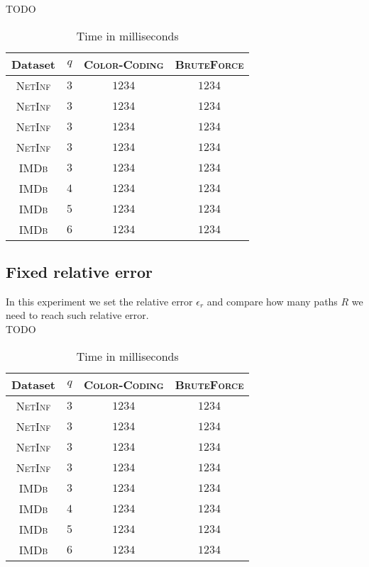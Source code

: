		
	TODO
	\begin{table}[h]
		\centering
		\label{my-label}
		\begin{tabular}{|c|c|c|c|}
			\hline
			Dataset 		& $q$ & \textsc{Color-Coding} 	& \textsc{BruteForce} \\ \hline
			\textsc{NetInf}	& $3$ & $1234$					& $1234$ \\ \hline
			\textsc{NetInf}	& $3$ & $1234$					& $1234$ \\ \hline
			\textsc{NetInf}	& $3$ & $1234$					& $1234$ \\ \hline
			\textsc{NetInf}	& $3$ & $1234$					& $1234$ \\ \hline
			\textsc{IMDb}	& $3$ & $1234$					& $1234$ \\ \hline
			\textsc{IMDb}	& $4$ & $1234$					& $1234$ \\ \hline
			\textsc{IMDb}	& $5$ & $1234$					& $1234$ \\ \hline
			\textsc{IMDb}	& $6$ & $1234$					& $1234$ \\ \hline
		\end{tabular}
		\caption{Time in milliseconds}
	\end{table}
		
	\subsection*{Fixed relative error}
	
	In this experiment we set the relative error $\epsilon_{r}$ and compare how many paths $R$ we need to reach such relative error.\\
	
	TODO
	\begin{table}[h]
		\centering
		\label{my-label}
		\begin{tabular}{|c|c|c|c|}
			\hline
			Dataset 		& $q$ & \textsc{Color-Coding} 	& \textsc{BruteForce} \\ \hline
			\textsc{NetInf}	& $3$ & $1234$					& $1234$ \\ \hline
			\textsc{NetInf}	& $3$ & $1234$					& $1234$ \\ \hline
			\textsc{NetInf}	& $3$ & $1234$					& $1234$ \\ \hline
			\textsc{NetInf}	& $3$ & $1234$					& $1234$ \\ \hline
			\textsc{IMDb}	& $3$ & $1234$					& $1234$ \\ \hline
			\textsc{IMDb}	& $4$ & $1234$					& $1234$ \\ \hline
			\textsc{IMDb}	& $5$ & $1234$					& $1234$ \\ \hline
			\textsc{IMDb}	& $6$ & $1234$					& $1234$ \\ \hline
		\end{tabular}
		\caption{Time in milliseconds}
	\end{table}
	
